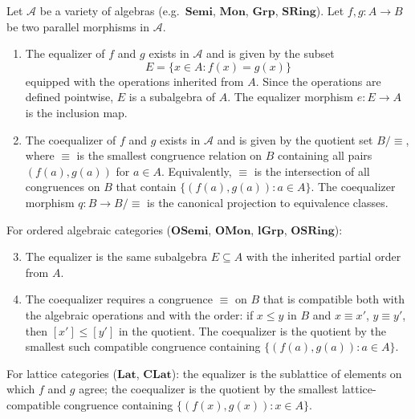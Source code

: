 \begin{proposition} \label{proposition:equalizers_subalgebra_and_coequalizers_congruence}
Let $\mathcal{A}$ be a variety of algebras (e.g.\ $\mathbf{Semi}$, $\mathbf{Mon}$, $\mathbf{Grp}$, $\mathbf{SRing}$). Let $f, g : A \to B$ be two parallel morphisms in $\mathcal{A}$.

\begin{enumerate}
    \item The equalizer of $f$ and $g$ exists in $\mathcal{A}$ and is given by the subset
    $$E = \{x \in A : f(x) = g(x)\}$$
    equipped with the operations inherited from $A$. Since the operations are defined pointwise, $E$ is a subalgebra of $A$. The equalizer morphism $e : E \to A$ is the inclusion map.

    \item The coequalizer of $f$ and $g$ exists in $\mathcal{A}$ and is given by the quotient set $B / \equiv$, where $\equiv$ is the smallest congruence relation on $B$ containing all pairs $(f(a), g(a))$ for $a \in A$. Equivalently, $\equiv$ is the intersection of all congruences on $B$ that contain $\{(f(a), g(a)) : a \in A\}$. The coequalizer morphism $q : B \to B / \equiv$ is the canonical projection to equivalence classes.
\end{enumerate}

For ordered algebraic categories ($\mathbf{OSemi}$, $\mathbf{OMon}$, $\mathbf{lGrp}$, $\mathbf{OSRing}$):

\begin{enumerate}
    \setcounter{enumi}{2}
    \item The equalizer is the same subalgebra $E \subseteq A$ with the inherited partial order from $A$.

    \item The coequalizer requires a congruence $\equiv$ on $B$ that is compatible both with the algebraic operations and with the order: if $x \leq y$ in $B$ and $x \equiv x'$, $y \equiv y'$, then $[x'] \leq [y']$ in the quotient. The coequalizer is the quotient by the smallest such compatible congruence containing $\{(f(a), g(a)) : a \in A\}$.
\end{enumerate}

For lattice categories ($\mathbf{Lat}$, $\mathbf{CLat}$): the equalizer is the sublattice of elements on which $f$ and $g$ agree; the coequalizer is the quotient by the smallest lattice-compatible congruence containing $\{(f(x), g(x)) : x \in A\}$.
\end{proposition}
